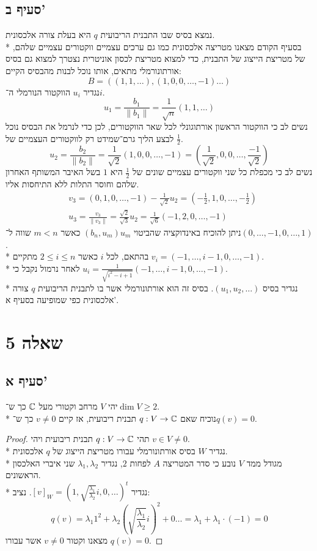\subsection{סעיף ב'}
נמצא בסיס שבו התבנית הריבועית $q$ היא בעלת צורה אלכסונית. \\*
בסעיף הקודם מצאנו מטריצה אלכסונית כמו גם ערכים עצמיים ווקטורים עצמיים שלהם, של מטריצת הייצוג של התבנית,
כדי למצוא מטריצת לכסון אוניטרית נצטרך למצוא גם בסיס אורתונורמלי מתאים, אותו נוכל לבנות מהבסיס הקיים:
\[
	B = \left( (1, 1, \hdots), (1, 0, 0, \hdots, -1) \hdots \right)
\]
נגדיר $u_i$ הווקטור הנורמלי ה־$i$.
\[
	u_1 = \frac{b_1}{\lVert b_1 \rVert} = \frac{1}{\sqrt{n}} (1, 1, \hdots)
\]
נשים לב כי הווקטור הראשון אורתוגונלי לכל שאר הווקטורים, לכן כדי לנרמל את הבסיס נוכל לבצע הליך גרם־שמידט רק לווקטורים העצמיים של $\frac{1}{2}$.
\[
	u_2 = \frac{b_2}{\lVert b_2 \rVert} = \frac{1}{\sqrt{2}} \left(1, 0, 0, \hdots, -1\right)
	= \left(\frac{1}{\sqrt{2}}, 0, 0, \hdots, \frac{-1}{\sqrt{2}}\right)
\]
נשים לב כי מכפלת כל שני ווקטורים עצמיים שונים של $\frac{1}{2}$ היא $1$ בשל האיבר המשותף האחרון שלהם וחוסר התלות ללא התיחסות אליו.
\begin{align*}
	& v_3 = (0, 1, 0, \hdots, -1) - \frac{1}{\sqrt{2}} u_2 = (-\frac{1}{2}, 1, 0, \hdots, -\frac{1}{2}) \\
	& u_3 = \frac{v_3}{\lVert v_3 \rVert} = \frac{\sqrt{2}}{\sqrt{3}} u_2 = \frac{1}{\sqrt{6}} (-1, 2, 0, \hdots, -1)
\end{align*}
ניתן להוכיח באינדוקציה שהביטוי $(b_n, u_m) u_m$ כאשר $m < n$ שווה ל־$(0, \hdots, -1, 0, \hdots, 1)$. \\*
בהתאם, לכל $i$ כאשר $2 \le i \le n$ מתקיים $v_i = (-1, \hdots, i - 1, 0, \hdots, -1)$. \\*
לאחר נרמול נקבל כי $u_i = \frac{1}{\sqrt{i^2 - i + 1}} (-1, \hdots, i - 1, 0, \hdots, -1)$. \\*
נגדיר בסיס $(u_1, u_2, \hdots)$. בסיס זה הוא אורתונורמלי אשר בו לתבנית הריבועית $q$ צורה אלכסונית כפי שמופיעה בסעיף א'.

\section{שאלה 5}
\subsection{סעיף א'}
יהי $V$ מרחב וקטורי מעל $\mathbb{C}$ כך ש־$\dim V \ge 2$. \\*
נוכיח שאם $q: V \to \mathbb{C}$ תבנית ריבועית, אז קיים $v \ne 0$ כך ש־$q(v) = 0$.
\begin{proof}
	תהי $q : V \to \mathbb{C}$ תבנית ריבועית ויהי $v \in V \ne 0$. \\*
	נגדיר $W$ בסיס אורתונורמלי עבורו מטריצת הייצוג של $q$ אלכסונית. \\*
	מגודל ממד $V$ נובע כי סדר המטריצה $A$ לפחות $2$, נגדיר $\lambda_1, \lambda_2$ שני איברי האלכסון הראשונים. \\*
	נגדיר ${[v]}_W = {(1, \sqrt{\frac{\lambda_1}{\lambda_2}}i, 0, \hdots)}^t$.
	נציב:
	\[
		q(v) = \lambda_1 1^2 + \lambda_2 {\left( \sqrt{\frac{\lambda_1}{\lambda_2}} i\right)}^2 + 0 \hdots
		= \lambda_1 + \lambda_1 \cdot (-1)
		= 0
	\]
	מצאנו וקטור $v \ne 0$ אשר עבורו $q(v) = 0$.
\end{proof}

